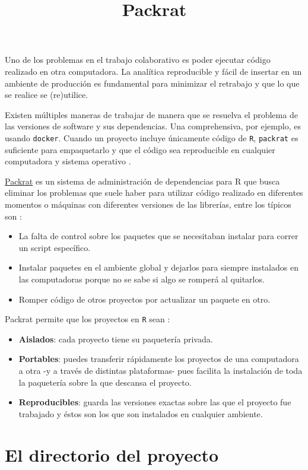 \documentclass[]{article}
\title{Packrat}
\author{}
\date{}
\providecommand{\tightlist}{%
  \setlength{\itemsep}{0pt}\setlength{\parskip}{0pt}}
\begin{document}
Uno de los problemas en el trabajo colaborativo es poder ejecutar código
realizado en otra computadora. La analítica reproducible y fácil de
insertar en un ambiente de producción es fundamental para minimizar el
retrabajo y que lo que se realice se (re)utilice.

Existen múltiples maneras de trabajar de manera que se resuelva el
problema de las versiones de software y sus dependencias. Una
comprehensiva, por ejemplo, es usando \texttt{docker}. Cuando un
proyecto incluye únicamente código de \texttt{R}, \texttt{packrat} es
suficiente para empaquetarlo y que el código sea reproducible en
cualquier computadora y sistema operativo \parencite{packrat}.

\href{https://rstudio.github.io/packrat/}{Packrat} es un sistema de
administración de dependencias para R que busca eliminar los problemas
que suele haber para utilizar código realizado en diferentes momentos o
máquinas con diferentes versiones de las librerías, entre los típicos
son \parencite{packratconcept}:

\begin{itemize}
\tightlist
\item
  La falta de control sobre los paquetes que se necesitaban instalar
  para correr un script específico.
\item
  Instalar paquetes en el ambiente global y dejarlos para siempre
  instalados en las computadoras porque no se sabe si algo se romperá al
  quitarlos.
\item
  Romper código de otros proyectos por actualizar un paquete en otro.
\end{itemize}

Packrat permite que los proyectos en \texttt{R} sean
\parencite{packratconcept}:

\begin{itemize}
\tightlist
\item
  \textbf{Aislados}: cada proyecto tiene su paquetería privada.
\item
  \textbf{Portables}: puedes transferir rápidamente los proyectos de una
  computadora a otra -y a través de distintas plataformas- pues facilita
  la instalación de toda la paquetería sobre la que descansa el
  proyecto.
\item
  \textbf{Reproducibles}: guarda las versiones exactas sobre las que el
  proyecto fue trabajado y éstos son los que son instalados en cualquier
  ambiente.
\end{itemize}

\section{El directorio del proyecto}\label{el-directorio-del-proyecto}
\end{document}

